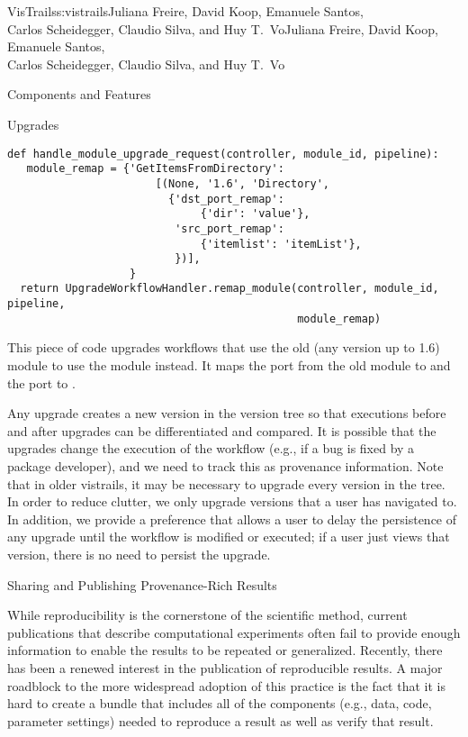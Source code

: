 \begin{aosachaptertoc}{VisTrails}{s:vistrails}{Juliana Freire, David Koop, Emanuele Santos, \\ Carlos Scheidegger, Claudio Silva, and Huy T.\ Vo}{Juliana Freire, David Koop, Emanuele Santos, \\ \hspace*{0.9cm} Carlos Scheidegger, Claudio Silva, and Huy T.\ Vo}
\begin{aosasect1}{Components and Features}
\begin{aosasect2}{Upgrades}
\begin{verbatim}
def handle_module_upgrade_request(controller, module_id, pipeline):
   module_remap = {'GetItemsFromDirectory':
                       [(None, '1.6', 'Directory',
                         {'dst_port_remap':
                              {'dir': 'value'},
                          'src_port_remap':
                              {'itemlist': 'itemList'},
                          })],
                   }
  return UpgradeWorkflowHandler.remap_module(controller, module_id, pipeline,
                                             module_remap)
\end{verbatim}

This piece of code upgrades workflows that use the old
 (any version up to 1.6) module to use the
 module instead.  It maps the  port from the
old module to  and the  port to
.

Any upgrade creates a new version in the version tree so that
executions before and after upgrades can be differentiated and
compared.  It is possible that the upgrades change the execution of
the workflow (e.g., if a bug is fixed by a package developer), and we
need to track this as provenance information.  Note that in older
vistrails, it may be necessary to upgrade every version in the tree.
In order to reduce clutter, we only upgrade versions that a user has
navigated to.  In addition, we provide a preference that allows a user
to delay the persistence of any upgrade until the workflow is modified
or executed; if a user just views that version, there is no need to
persist the upgrade.

\end{aosasect2}

\begin{aosasect2}{Sharing and Publishing Provenance-Rich Results}
\label{sec.vistrails.publish}

While reproducibility is the cornerstone of the scientific method,
current publications that describe computational experiments 
often fail to provide enough information to enable the results
to be repeated or generalized. Recently, there has been a renewed
interest in the publication of reproducible results. A major roadblock
to the more widespread adoption of this practice is the fact that it
is hard to create a bundle that includes all of the components (e.g.,
data, code, parameter settings) needed to reproduce a result as well
as verify that result.


\end{aosasect2}
\end{aosasect1}
\end{aosachaptertoc}
